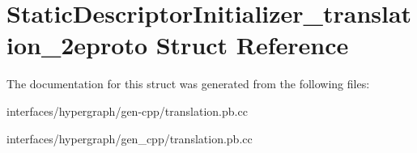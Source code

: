\hypertarget{structStaticDescriptorInitializer__translation__2eproto}{
\section{StaticDescriptorInitializer\_\-translation\_\-2eproto Struct Reference}
\label{structStaticDescriptorInitializer__translation__2eproto}
}


The documentation for this struct was generated from the following files:\begin{DoxyCompactItemize}
\item 
interfaces/hypergraph/gen-\/cpp/translation.pb.cc\item 
interfaces/hypergraph/gen\_\-cpp/translation.pb.cc\end{DoxyCompactItemize}
